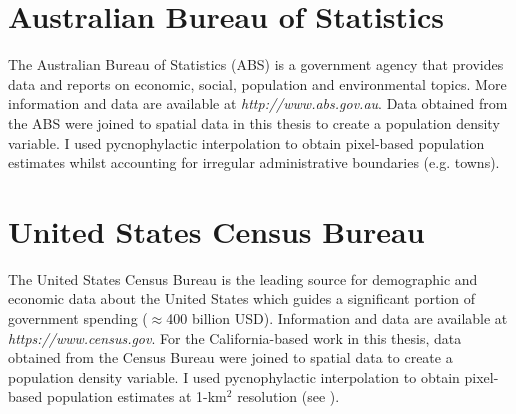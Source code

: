 \section{Australian Bureau of Statistics}\label{abs}

The Australian Bureau of Statistics (ABS) is a government agency that provides data and reports on economic, social, population and environmental topics. More information and data are available at \textit{http://www.abs.gov.au}. Data obtained from the ABS were joined to spatial data in this thesis to create a population density variable. I used pycnophylactic interpolation \citep[see][]{tobl79} to obtain pixel-based population estimates whilst accounting for irregular administrative boundaries (e.g. towns).

\section{United States Census Bureau}

The United States Census Bureau is the leading source for demographic and economic data about the United States which guides a significant portion of government spending ($\approx$400 billion USD). Information and data are available at \textit{https://www.census.gov}. For the California-based work in this thesis, data obtained from the Census Bureau were joined to spatial data to create a population density variable. I used pycnophylactic interpolation to obtain pixel-based population estimates at 1-km$^2$ resolution (see ).
